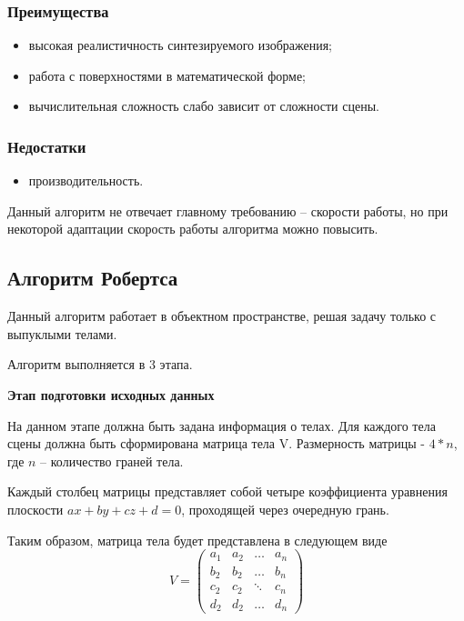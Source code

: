 \subsubsection*{Преимущества}
\begin{itemize}
	\item	высокая реалистичность синтезируемого изображения;
	\item	работа с поверхностями в математической форме;
	\item	вычислительная сложность слабо зависит от сложности сцены.
\end{itemize}

\subsubsection*{Недостатки}
\begin{itemize}
	\item	производительность.
\end{itemize}

Данный алгоритм не отвечает главному требованию – скорости работы, но при некоторой адаптации скорость работы алгоритма можно повысить.

\subsection{Алгоритм Робертса}
Данный алгоритм работает в объектном пространстве, решая задачу только с выпуклыми телами.

Алгоритм выполняется в 3 этапа.

\textbf{Этап подготовки исходных данных}

На данном этапе должна быть задана информация о телах. Для каждого тела сцены должна быть сформирована матрица тела V. Размерность матрицы - $4*n$, где $n$ – количество граней тела.

Каждый столбец матрицы представляет собой четыре коэффициента уравнения плоскости  $ax+by+cz+d=0$, проходящей через очередную грань.

Таким образом, матрица тела будет представлена в следующем виде
\begin{equation}
	\label{eq:matr}
	V = \begin{pmatrix}
		a_{1} & a_{2} & \ldots & a_{n}\\
		b_{2} & b_{2} & \ldots & b_{n}\\
		c_{2} & c_{2} & \ddots & c_{n}\\
		d_{2} & d_{2} & \ldots & d_{n}
	\end{pmatrix}
\end{equation}

